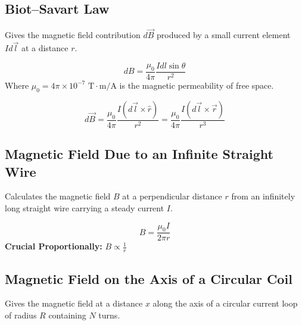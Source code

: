 \documentclass[11pt,a4paper]{article}
\begin{document}
\subsection{Biot--Savart Law}
\begin{pyqbox}
    Gives the magnetic field contribution $d\vec{B}$ produced by a small current element $Id\vec{l}$ at a distance $r$.
\end{pyqbox}

\begin{formulabox}
    \[ dB = \frac{\mu_0}{4\pi} \frac{I dl \sin\theta}{r^2} \]
    Where $\mu_0 = 4\pi \times 10^{-7}\text{ T}\cdot\text{m/A}$ is the magnetic permeability of free space.
\end{formulabox}

\begin{formulabox}
    \[ d\vec{B} = \frac{\mu_0}{4\pi} \frac{I(d\vec{l} \times \hat{r})}{r^2} = \frac{\mu_0}{4\pi} \frac{I(d\vec{l} \times \vec{r})}{r^3} \]
\end{formulabox}

\subsection{Magnetic Field Due to an Infinite Straight Wire}
\begin{pyqbox}
    Calculates the magnetic field $B$ at a perpendicular distance $r$ from an infinitely long straight wire carrying a steady current $I$.
\end{pyqbox}

\begin{formulabox}
    \[ B = \frac{\mu_0 I}{2\pi r} \]
    \textbf{Crucial Proportionally:} $B \propto \frac{1}{r}$
\end{formulabox}

\subsection{Magnetic Field on the Axis of a Circular Coil}
\begin{pyqbox}
    Gives the magnetic field at a distance $x$ along the axis of a circular current loop of radius $R$ containing $N$ turns.
\end{pyqbox}
\end{document}
